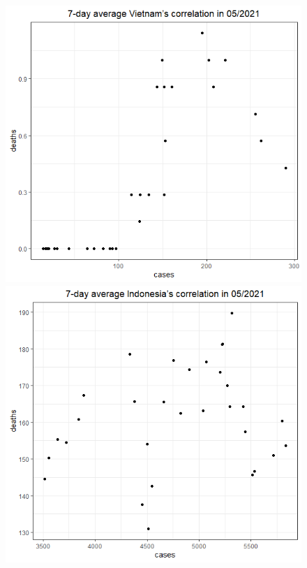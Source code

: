\documentclass[english,10pt,table]{beamer}
\begin{document}
{\begin{figure}[H]
\begin{center}
        \includegraphics[scale = 0.2]{ix/ix.3/VN_05_2021.png}
        \includegraphics[scale = 0.2]{ix/ix.3/IDN_05_2021.png}

\end{center}
\end{figure}}
\end{document}
